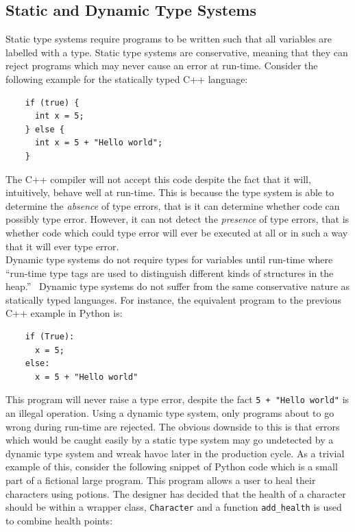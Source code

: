 \documentclass[12pt, titlepage]{article}
\begin{document}
\subsection{Static and Dynamic Type Systems}
Static type systems require programs to be written such that all variables are labelled with a type. Static type systems are conservative, meaning that they can reject programs which may never cause an error at run-time. Consider the following example for the statically typed C++ language:
\begin{lstlisting}
	if (true) {	
	  int x = 5;
	} else {
	  int x = 5 + "Hello world";
	}
\end{lstlisting}
The C++ compiler will not accept this code despite the fact that it will, intuitively, behave well at run-time. This is because the type system is able to determine the \textit{absence} of type errors, that is it can determine whether code can possibly type error. However, it can not detect the \textit{presence} of type errors, that is whether code which could type error will ever be executed at all or in such a way that it will ever type error. \\
\indent Dynamic type systems do not require types for variables until run-time where ``run-time type tags are used to distinguish different kinds of structures in the heap.''~\cite{pierce02} Dynamic type systems do not suffer from the same conservative nature as statically typed languages. For instance, the equivalent program to the previous C++ example in Python is:
\begin{lstlisting}
	if (True):	
	  x = 5;
	else:
	  x = 5 + "Hello world"
\end{lstlisting}
This program will never raise a type error, despite the fact \texttt{5 + "Hello  world"} is an illegal operation. Using a dynamic type system, only programs about to go wrong during run-time are rejected. The obvious downside to this is that errors which would be caught easily by a static type system may go undetected by a dynamic type system and wreak havoc later in the production cycle. As a trivial example of this, consider the following snippet of Python code which is a small part of a fictional large program. This program allows a user to heal their characters using potions. The designer has decided that the health of a character should be within a wrapper class, \texttt{Character} and a function \texttt{add\_health} is used to combine health points:
\end{document}
